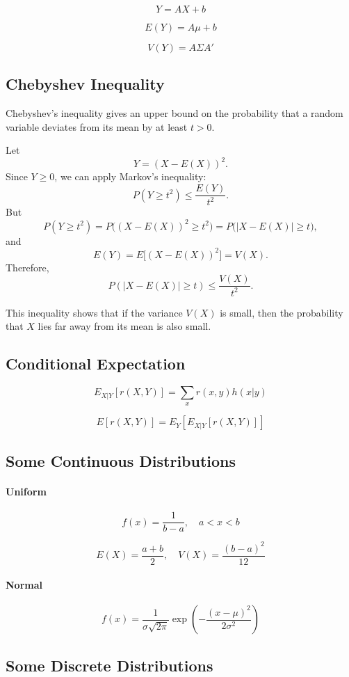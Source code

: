 \[
Y = AX + b
\]

\[
E(Y) = A\mu + b
\]

\[
V(Y) = A \Sigma A'
\]

\subsection{Chebyshev Inequality}

Chebyshev's inequality gives an upper bound on the probability that a random variable deviates from its mean by at least \(t>0\).

Let
\[
Y = (X - E(X))^2 .
\]
Since \(Y \ge 0\), we can apply Markov's inequality:
\[
P(Y \ge t^2) \le \frac{E(Y)}{t^2}.
\]
But
\[
P(Y \ge t^2)
=
P\bigl((X-E(X))^2 \ge t^2\bigr)
=
P\bigl(|X-E(X)| \ge t\bigr),
\]
and
\[
E(Y) = E\bigl[(X-E(X))^2\bigr] = V(X).
\]
Therefore,
\[
P(|X - E(X)| \ge t) \le \frac{V(X)}{t^2}.
\]

This inequality shows that if the variance \(V(X)\) is small, then the probability that \(X\) lies far away from its mean is also small.

\subsection{Conditional Expectation}

\[
E_{X|Y}[r(X,Y)] = \sum_x r(x,y) h(x|y)
\]

\[
E[r(X,Y)] = E_Y[E_{X|Y}[r(X,Y)]]
\]

\subsection{Some Continuous Distributions}

\paragraph{Uniform}
\[
f(x) = \frac{1}{b-a}, \quad a < x < b
\]

\[
E(X) = \frac{a+b}{2}, \quad V(X) = \frac{(b-a)^2}{12}
\]

\paragraph{Normal}
\[
f(x) = \frac{1}{\sigma \sqrt{2\pi}} 
\exp\left(-\frac{(x-\mu)^2}{2\sigma^2}\right)
\]

\subsection{Some Discrete Distributions}

